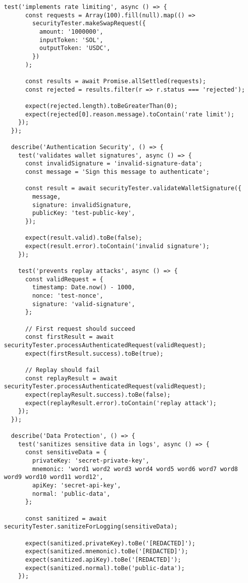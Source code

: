 \documentclass[11pt,a4paper]{article}
\begin{document}
\begin{lstlisting}[style=typescript, caption=Security Testing Suite]
    test('implements rate limiting', async () => {
      const requests = Array(100).fill(null).map(() => 
        securityTester.makeSwapRequest({
          amount: '1000000',
          inputToken: 'SOL',
          outputToken: 'USDC',
        })
      );

      const results = await Promise.allSettled(requests);
      const rejected = results.filter(r => r.status === 'rejected');
      
      expect(rejected.length).toBeGreaterThan(0);
      expect(rejected[0].reason.message).toContain('rate limit');
    });
  });

  describe('Authentication Security', () => {
    test('validates wallet signatures', async () => {
      const invalidSignature = 'invalid-signature-data';
      const message = 'Sign this message to authenticate';

      const result = await securityTester.validateWalletSignature({
        message,
        signature: invalidSignature,
        publicKey: 'test-public-key',
      });

      expect(result.valid).toBe(false);
      expect(result.error).toContain('invalid signature');
    });

    test('prevents replay attacks', async () => {
      const validRequest = {
        timestamp: Date.now() - 1000,
        nonce: 'test-nonce',
        signature: 'valid-signature',
      };

      // First request should succeed
      const firstResult = await securityTester.processAuthenticatedRequest(validRequest);
      expect(firstResult.success).toBe(true);

      // Replay should fail
      const replayResult = await securityTester.processAuthenticatedRequest(validRequest);
      expect(replayResult.success).toBe(false);
      expect(replayResult.error).toContain('replay attack');
    });
  });

  describe('Data Protection', () => {
    test('sanitizes sensitive data in logs', async () => {
      const sensitiveData = {
        privateKey: 'secret-private-key',
        mnemonic: 'word1 word2 word3 word4 word5 word6 word7 word8 word9 word10 word11 word12',
        apiKey: 'secret-api-key',
        normal: 'public-data',
      };

      const sanitized = await securityTester.sanitizeForLogging(sensitiveData);

      expect(sanitized.privateKey).toBe('[REDACTED]');
      expect(sanitized.mnemonic).toBe('[REDACTED]');
      expect(sanitized.apiKey).toBe('[REDACTED]');
      expect(sanitized.normal).toBe('public-data');
    });


\end{lstlisting}
\end{document}
